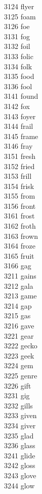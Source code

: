 3124 flyer \\
3125 foam \\
3126 foe \\
3131 fog \\
3132 foil \\
3133 folic \\
3134 folk \\
3135 food \\
3136 fool \\
3141 found \\
3142 fox \\
3143 foyer \\
3144 frail \\
3145 frame \\
3146 fray \\
3151 fresh \\
3152 fried \\
3153 frill \\
3154 frisk \\
3155 from \\
3156 front \\
3161 frost \\
3162 froth \\
3163 frown \\
3164 froze \\
3165 fruit \\
3166 gag \\
3211 gains \\
3212 gala \\
3213 game \\
3214 gap \\
3215 gas \\
3216 gave \\
3221 gear \\
3222 gecko \\
3223 geek \\
3224 gem \\
3225 genre \\
3226 gift \\
3231 gig \\
3232 gills \\
3233 given \\
3234 giver \\
3235 glad \\
3236 glass \\
3241 glide \\
3242 gloss \\
3243 glove \\
3244 glow \\
